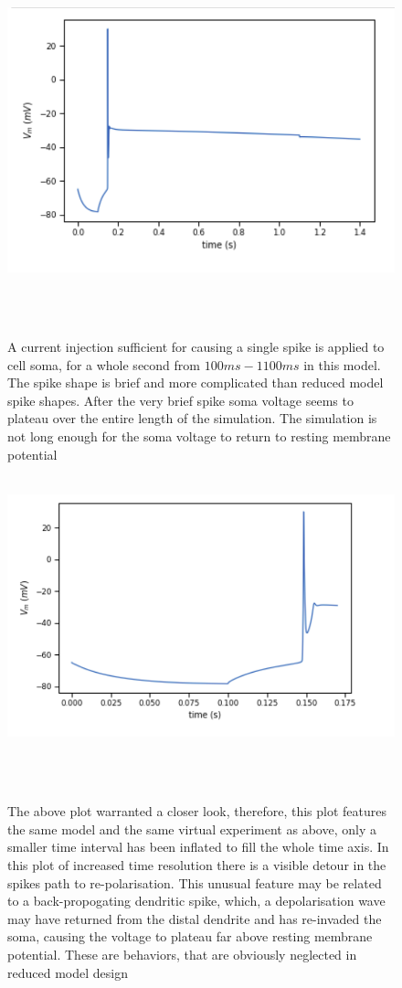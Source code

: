 \begin{figure}
  \centering
    \includegraphics[scale=0.8]{figures/correct_active_l5pc.png}
    \caption[Short duration spike in the L5PC model]{A current injection sufficient for causing a single spike is applied to cell soma, for a whole second from $100ms-1100ms$ in this model. The spike shape is brief and more complicated than reduced model spike shapes. After the very brief spike soma voltage seems to plateau over the entire length of the simulation. The simulation is not long enough for the soma voltage to return to resting membrane potential}
  \label{fig:sub1}
\end{figure}

\begin{figure}
 \begin{center}
    \includegraphics[scale=0.8]{figures/spike_shape.png}
    \caption[Complex spike in the L5PC model]{The above plot warranted a closer look, therefore, this plot features the same model and the same virtual experiment as above, only a smaller time interval has been inflated to fill the whole time axis. In this plot of increased time resolution there is a visible detour in the spikes path to re-polarisation. This unusual feature may be related to a back-propogating dendritic spike, which, a depolarisation wave may have returned from the distal dendrite and has re-invaded the soma, causing the voltage to plateau far above resting membrane potential. These are behaviors, that are obviously neglected in reduced model design}
  \label{fig:sub1}
  \end{center}
\end{figure}


